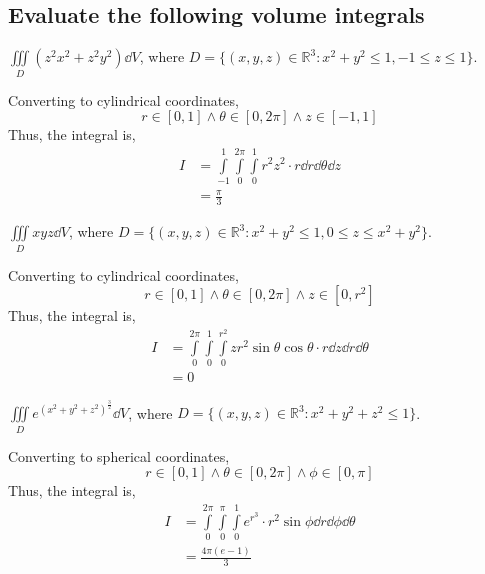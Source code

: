 \subsection{Evaluate the following volume integrals}
\begin{asign}
	$\iiint\limits_D (z^2x^2+z^2y^2)\dd{V}$, where $D=\{(x,y,z)\in\mathbb{R}^3:x^2+y^2\leq 1, -1\leq z\leq 1\}$.
\end{asign}
\begin{anse}
	Converting to cylindrical coordinates,
	\[r\in[0,1]\land \theta\in[0,2\pi]\land z\in[-1,1]\]
	Thus, the integral is,
	\[\begin{split}
		I&=\int\limits_{-1}^1\int\limits_0^{2\pi}\int\limits_0^1r^2z^2\cdot r\dd{r}\dd{\theta}\dd{z}\\
		&=\frac{\pi}{3}
	\end{split}\]
\end{anse}
\begin{asign}
	$\iiint\limits_D xyz\dd{V}$, where $D=\{(x,y,z)\in\mathbb{R}^3:x^2+y^2\leq1, 0\leq z\leq x^2+y^2\}$.
\end{asign}
\begin{anse}
	Converting to cylindrical coordinates,
	\[r\in[0,1]\land \theta\in[0,2\pi]\land z\in[0,r^2]\]
	Thus, the integral is,
	\[\begin{split}
		I&=\int\limits_0^{2\pi}\int\limits_0^1\int\limits_0^{r^2}zr^2\sin\theta\cos\theta\cdot r\dd{z}\dd{r}\dd{\theta}\\
		&=0
	\end{split}\]
\end{anse}
\begin{asign}
	$\iiint\limits_D e^{(x^2+y^2+z^2)^\frac{3}{2}}\dd{V}$, where $D=\{(x,y,z)\in\mathbb{R}^3:x^2+y^2+z^2\leq 1\}$.
\end{asign}
\begin{anse}
	Converting to spherical coordinates,
	\[r\in[0,1]\land \theta\in[0,2\pi]\land \phi\in[0,\pi]\]
	Thus, the integral is,
	\[\begin{split}
		I&=\int\limits_0^{2\pi}\int\limits_0^{\pi}\int\limits_0^1e^{r^3}\cdot r^2\sin\phi \dd{r}\dd{\phi}\dd{\theta}\\
		&=\frac{4\pi(e-1)}{3}
	\end{split}\]
\end{anse}
